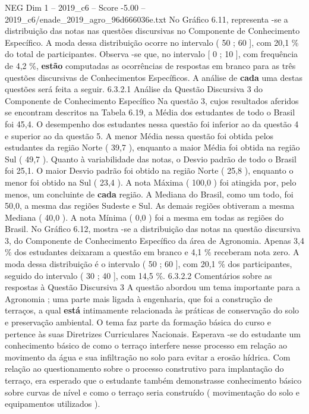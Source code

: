 \begin{textsample}{NEG Dim 1 – 2019\_c6 – Score -5.00 – 2019\_c6/enade\_2019\_agro\_96d666036e.txt}
No Gráfico 6.11, representa -se a distribuição das notas nas questões discursivas no Componente de Conhecimento Específico.
A moda dessa distribuição ocorre no intervalo ( 50 ; 60 ], com 20,1 \% do total de participantes.
Observa -se que, no intervalo [ 0 ; 10 ], com frequência de 4,2 \%, \textbf{estão} computadas as ocorrências de respostas em branco para as três questões discursivas de Conhecimentos Específicos.
A análise de \textbf{cada} uma destas questões será feita a seguir. 6.3.2.1 Análise da Questão Discursiva 3 do Componente de Conhecimento Específico Na questão 3, cujos resultados aferidos se encontram descritos na Tabela 6.19, a Média dos estudantes de todo o Brasil foi 45,4.
O desempenho dos estudantes nessa questão foi inferior ao da questão 4 e superior ao da questão 5.
A menor Média nessa questão foi obtida pelos estudantes da região Norte ( 39,7 ), enquanto a maior Média foi obtida na região Sul ( 49,7 ).
Quanto à variabilidade das notas, o Desvio padrão de todo o Brasil foi 25,1.
O maior Desvio padrão foi obtido na região Norte ( 25,8 ), enquanto o menor foi obtido na Sul ( 23,4 ).
A nota Máxima ( 100,0 ) foi atingida por, pelo menos, um concluinte de \textbf{cada} região.
A Mediana do Brasil, como um todo, foi 50,0, a mesma das regiões Sudeste e Sul.
As demais regiões obtiveram a mesma Mediana ( 40,0 ).
A nota Mínima ( 0,0 ) foi a mesma em todas as regiões do Brasil.
No Gráfico 6.12, mostra -se a distribuição das notas na questão discursiva 3, do Componente de Conhecimento Específico da área de Agronomia.
Apenas 3,4 \% dos estudantes deixaram a questão em branco e 4,1 \% receberam nota zero.
A moda dessa distribuição é o intervalo ( 50 ; 60 ], com 20,1 \% dos participantes, seguido do intervalo ( 30 ; 40 ], com 14,5 \%. 6.3.2.2 Comentários sobre as respostas à Questão Discursiva 3 A questão abordou um tema importante para a Agronomia ; uma parte mais ligada à engenharia, que foi a construção de terraços, a qual \textbf{está} intimamente relacionada às práticas de conservação do solo e preservação ambiental.
O tema faz parte da formação básica do curso e pertence às suas Diretrizes Curriculares Nacionais.
Esperava -se do estudante um conhecimento básico de como o terraço interfere nesse processo em relação ao movimento da água e sua infiltração no solo para evitar a erosão hídrica.
Com relação ao questionamento sobre o processo construtivo para implantação do terraço, era esperado que o estudante também demonstrasse conhecimento básico sobre curvas de nível e como o terraço seria construído ( movimentação do solo e equipamentos utilizados ).

\end{textsample}
